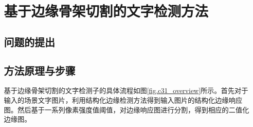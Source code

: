 ﻿%
%
%
%
%
%

\chapter{基于边缘骨架切割的文字检测方法}

    \section{问题的提出}

    \section{方法原理与步骤}

    基于边缘骨架切割的文字检测子的具体流程如图\ref{fig.c31_overview}所示。首先对于输入的场景文字图片，利用结构化边缘检测方法\cite{Dollar2015Fast}得到输入图片的结构化边缘响应图。然后基于一系列像素强度值阈值，对边缘响应图进行分割，得到相应的二值化边缘图。


